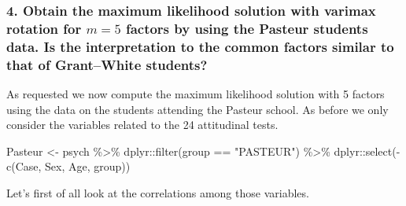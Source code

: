 \documentclass[
  letterpaper,
  DIV=11,
  numbers=noendperiod]{scrartcl}
\newenvironment{Shaded}{\begin{snugshade}}{\end{snugshade}}
\newcommand{\FunctionTok}[1]{\textcolor[rgb]{0.28,0.35,0.67}{#1}}
\newcommand{\NormalTok}[1]{\textcolor[rgb]{0.00,0.23,0.31}{#1}}
\newcommand{\OtherTok}[1]{\textcolor[rgb]{0.00,0.23,0.31}{#1}}
\newcommand{\SpecialCharTok}[1]{\textcolor[rgb]{0.37,0.37,0.37}{#1}}
\newcommand{\StringTok}[1]{\textcolor[rgb]{0.13,0.47,0.30}{#1}}
\begin{document}
\hypertarget{obtain-the-maximum-likelihood-solution-with-varimax-rotation-for-m-5-factors-by-using-the-pasteur-students-data.-is-the-interpretation-to-the-common-factors-similar-to-that-of-grantwhite-students}{%
\subsubsection{\texorpdfstring{4. Obtain the maximum likelihood solution
with varimax rotation for \(m = 5\) factors by using the Pasteur
students data. Is the interpretation to the common factors similar to
that of Grant--White
students?}{4. Obtain the maximum likelihood solution with varimax rotation for m = 5 factors by using the Pasteur students data. Is the interpretation to the common factors similar to that of Grant--White students?}}\label{obtain-the-maximum-likelihood-solution-with-varimax-rotation-for-m-5-factors-by-using-the-pasteur-students-data.-is-the-interpretation-to-the-common-factors-similar-to-that-of-grantwhite-students}}

As requested we now compute the maximum likelihood solution with 5
factors using the data on the students attending the Pasteur school. As
before we only consider the variables related to the 24 attitudinal
tests.

\begin{Shaded}
\begin{Highlighting}[]
\NormalTok{Pasteur }\OtherTok{\textless{}{-}}\NormalTok{ psych }\SpecialCharTok{\%\textgreater{}\%}\NormalTok{ dplyr}\SpecialCharTok{::}\FunctionTok{filter}\NormalTok{(group }\SpecialCharTok{==} \StringTok{"PASTEUR"}\NormalTok{) }\SpecialCharTok{\%\textgreater{}\%}
\NormalTok{dplyr}\SpecialCharTok{::}\FunctionTok{select}\NormalTok{(}\SpecialCharTok{{-}}\FunctionTok{c}\NormalTok{(Case, Sex, Age, group))}
\end{Highlighting}
\end{Shaded}

Let's first of all look at the correlations among those variables.
\end{document}
